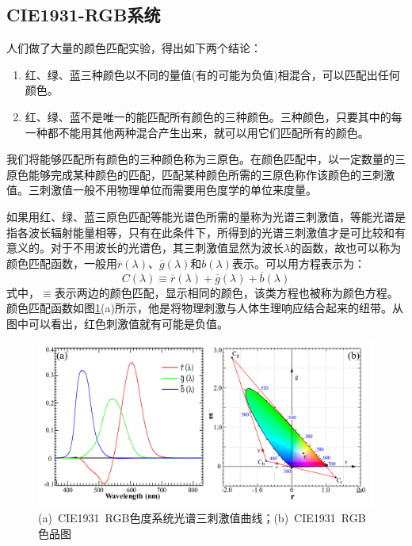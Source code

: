 \subsection{CIE1931-RGB系统}
人们做了大量的颜色匹配实验，得出如下两个结论：
\begin{enumerate}[(1)]
	\item 
	红、绿、蓝三种颜色以不同的量值(有的可能为负值)相混合，可以匹配出任何颜色。
	\item 
	红、绿、蓝不是唯一的能匹配所有颜色的三种颜色。三种颜色，只要其中的每一种都不能用其他两种混合产生出来，就可以用它们匹配所有的颜色。
\end{enumerate}

我们将能够匹配所有颜色的三种颜色称为三原色。在颜色匹配中，以一定数量的三原色能够完成某种颜色的匹配，匹配某种颜色所需的三原色称作该颜色的三刺激值。三刺激值一般不用物理单位而需要用色度学的单位来度量。

如果用红、绿、蓝三原色匹配等能光谱色所需的量称为光谱三刺激值，等能光谱是指各波长辐射能量相等，只有在此条件下，所得到的光谱三刺激值才是可比较和有意义的。对于不用波长的光谱色，其三刺激值显然为波长$\lambda$的函数，故也可以称为颜色匹配函数，一般用$\overline{r}(\lambda)$、$\overline{g}(\lambda)$和$\overline{b}(\lambda)$表示。可以用方程表示为：
\begin{equation}
\label{guangpuse}
C(\lambda)\equiv\overline{r}(\lambda)+\overline{g}(\lambda)+\overline{b}(\lambda)
\end{equation}
式中，$\equiv$表示两边的颜色匹配，显示相同的颜色，该类方程也被称为颜色方程。颜色匹配函数如图\ref{color_rgb_combined}(a)所示，他是将物理刺激与人体生理响应结合起来的纽带。从图中可以看出，红色刺激值就有可能是负值。

\begin{figure}[htb]
	\centering
	\includegraphics[width=16cm]{./Pictures/color_rgb_combined.jpg}
	\captionsetup{justification=centering}
	\caption{(a)~CIE1931~RGB色度系统光谱三刺激值曲线；(b)~CIE1931~RGB色品图\cite{wikicie1931}}
	\label{color_rgb_combined}
\end{figure}

